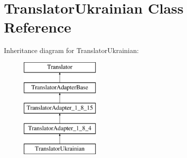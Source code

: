 \hypertarget{class_translator_ukrainian}{}\section{Translator\+Ukrainian Class Reference}
\label{class_translator_ukrainian}
Inheritance diagram for Translator\+Ukrainian\+:\begin{figure}[H]
\begin{center}
\leavevmode
\includegraphics[height=5.000000cm]{class_translator_ukrainian}
\end{center}
\end{figure}
